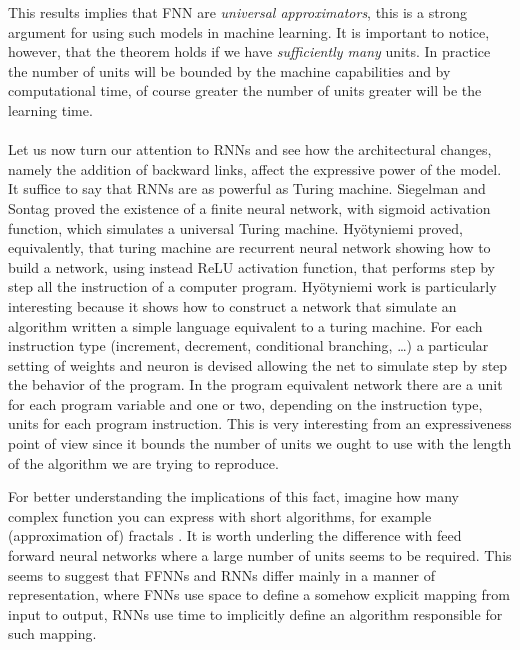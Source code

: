 This results implies that FNN are \textit{universal approximators}, this is a strong argument for using such models in machine learning.
It is important to notice, however, that the theorem holds if we have \textit{sufficiently many} units. In practice the number of units will be bounded
by the machine capabilities and by computational time, of course greater the number of units greater will be the learning time.
\\\\Let us now turn our attention to RNNs and see how the architectural changes, namely the addition of backward links, affect the expressive power of the model.
It suffice to say that RNNs are as powerful as Turing machine. Siegelman and Sontag \cite{Siegelmann91turingcomputability} proved the existence 
of a finite neural network, with sigmoid activation function, which simulates a universal Turing machine. Hy{\"o}tyniemi \cite{Hyotyniemi96turingmachines} proved, equivalently,
that turing machine are recurrent neural network showing how to build a network, using instead ReLU activation function, that performs step by step 
all the instruction of a computer program.
Hy{\"o}tyniemi work is particularly interesting because it shows how to construct a network that simulate an algorithm written a simple language equivalent to a turing machine.
For each instruction type (increment, decrement, conditional branching, \dots) a particular setting of weights and neuron is devised allowing the net to simulate step by step the behavior of the program. 
In the program equivalent network there are a unit for each program variable and one or two, depending on the instruction type, units for each program instruction.
This is very interesting from an expressiveness point of view since it bounds the number of units we ought to use with the length of the algorithm we are trying to reproduce.

For better understanding the implications of this fact, imagine how many complex function you can express with short algorithms, for example (approximation of) fractals .
It is worth underling the difference with feed forward neural networks where a large number of units seems to be required. This seems to suggest that FFNNs and RNNs differ mainly in a manner of 
representation, where FNNs use space to define a somehow explicit mapping from input to output, RNNs use time to implicitly define an algorithm responsible for such mapping. 

